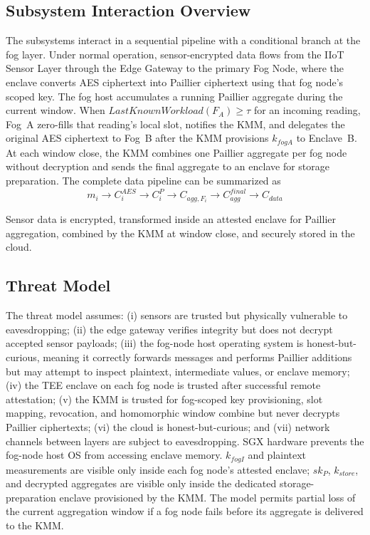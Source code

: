 \documentclass[conference]{IEEEtran}
\begin{document}
    \subsection{Subsystem Interaction Overview}
    The subsystems interact in a sequential pipeline with a conditional branch at the fog layer. Under normal operation, sensor-encrypted data flows from the IIoT Sensor Layer through the Edge Gateway to the primary Fog Node, where the enclave converts AES ciphertext into Paillier ciphertext using that fog node's scoped key. The fog host accumulates a running Paillier aggregate during the current window. When $LastKnownWorkload(F_A) \geq \tau$ for an incoming reading, Fog~A zero-fills that reading's local slot, notifies the KMM, and delegates the original AES ciphertext to Fog~B after the KMM provisions $k_{fogA}$ to Enclave~B. At each window close, the KMM combines one Paillier aggregate per fog node without decryption and sends the final aggregate to an enclave for storage preparation. The complete data pipeline can be summarized as
    \begin{equation}
    m_i \rightarrow C_i^{AES} \rightarrow C_i^P \rightarrow C_{agg,F_i} \rightarrow C_{agg}^{final} \rightarrow C_{data}
    \end{equation}

    Sensor data is encrypted, transformed inside an attested enclave for Paillier aggregation, combined by the KMM at window close, and securely stored in the cloud.


    \subsection{Threat Model}
    The threat model assumes: (i) sensors are trusted but physically vulnerable to eavesdropping; (ii) the edge gateway verifies integrity but does not decrypt accepted sensor payloads; (iii) the fog-node host operating system is honest-but-curious, meaning it correctly forwards messages and performs Paillier additions but may attempt to inspect plaintext, intermediate values, or enclave memory; (iv) the TEE enclave on each fog node is trusted after successful remote attestation; (v) the KMM is trusted for fog-scoped key provisioning, slot mapping, revocation, and homomorphic window combine but never decrypts Paillier ciphertexts; (vi) the cloud is honest-but-curious; and (vii) network channels between layers are subject to eavesdropping. SGX hardware prevents the fog-node host OS from accessing enclave memory. $k_{fogI}$ and plaintext measurements are visible only inside each fog node's attested enclave; $sk_P$, $k_{store}$, and decrypted aggregates are visible only inside the dedicated storage-preparation enclave provisioned by the KMM. The model permits partial loss of the current aggregation window if a fog node fails before its aggregate is delivered to the KMM.
\end{document}
